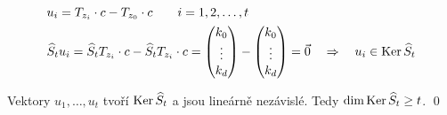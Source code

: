 \begin{align*}
	&u_i = T_{z_i}\cdot c - T_{z_0}\cdot c\qquad i = 1, 2, \dots, t \\
	&\widehat S_t u_i = \widehat S_t T_{z_i}\cdot c - \widehat S_t T_{z_i}\cdot c = \left(\begin{matrix}k_0 \\ \vdots \\ k_d\end{matrix}\right) - \left(\begin{matrix}k_0 \\ \vdots \\ k_d\end{matrix}\right) = \vec 0 \quad\Rightarrow\quad u_i\in\operatorname{Ker} \widehat S_t\\
\end{align*}

Vektory $u_1,\dots, u_t$ tvoří $\operatorname{Ker} \widehat S_t$ a jsou lineárně nezávislé. Tedy $\dim\operatorname{Ker}\widehat S_t \ge t$.
\qed
